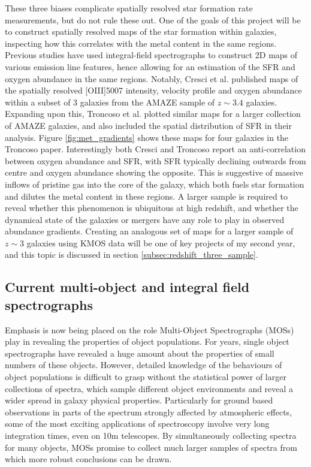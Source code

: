 \documentclass{literature}
\begin{document}
These three biases complicate spatially resolved star formation rate measurements, but do not rule these out. One of the goals of this project will be to construct spatially resolved maps of the star formation within galaxies, inspecting how this correlates with the metal content in the same regions. Previous studies have used integral-field spectrographs to construct 2D maps of various emission line features, hence allowing for an estimation of the SFR and oxygen abundance in the same regions. Notably, Cresci et al. \citep{Cresci2010} published maps of the spatially resolved [OIII]5007 intensity, velocity profile and oxygen abundance within a subset of 3 galaxies from the AMAZE sample \citep{Maiolino2008} of $z \sim 3.4$ galaxies. Expanding upon this, Troncoso et al. \citep{Troncoso_2014} plotted similar maps for a larger collection of AMAZE galaxies, and also included the spatial distribution of SFR in their analysis. Figure \ref{fig:met_gradients} shows these maps for four galaxies in the Troncoso paper. Interestingly both Cresci and Troncoso report an anti-correlation between oxygen abundance and SFR, with SFR typically declining outwards from centre and oxygen abundance showing the opposite. This is suggestive of massive inflows of pristine gas into the core of the galaxy, which both fuels star formation and dilutes the metal content in these regions. A larger sample is required to reveal whether this phenomenon is ubiquitous at high redshift, and whether the dynamical state of the galaxies or mergers have any role to play in observed abundance gradients. Creating an analogous set of maps for a larger sample of $z \sim 3$ galaxies using KMOS data will be one of key projects of my second year, and this topic is discussed in section \ref{subsec:redshift_three_sample}.




\subsection{Current multi-object and integral field spectrographs}\label{subsec:current_int}
	
Emphasis is now being placed on the role Multi-Object Spectrographs (MOSs) play in revealing the properties of object populations. For years, single object spectrographs have revealed a huge amount about the properties of small numbers of these objects. However, detailed knowledge of the behaviours of object populations is difficult to grasp without the statistical power of larger collections of spectra, which sample different object environments and reveal a wider spread in galaxy physical properties. Particularly for ground based observations in parts of the spectrum strongly affected by atmospheric effects, some of the most exciting applications of spectroscopy involve very long integration times, even on 10m telescopes. By simultaneously collecting spectra for many objects, MOSs promise to collect much larger samples of spectra from which more robust conclusions can be drawn. \\
\end{document}
